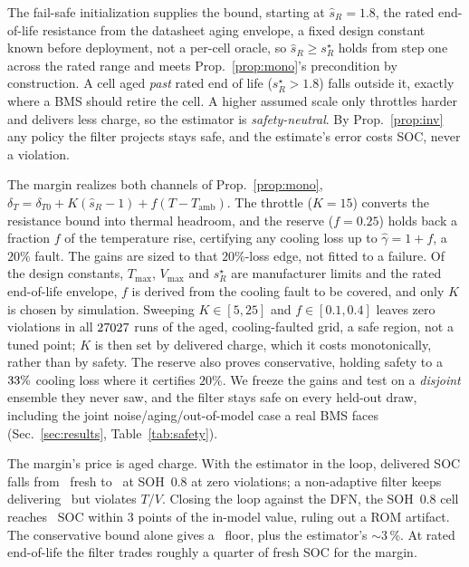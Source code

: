 \documentclass[conference]{IEEEtran}
\newcommand{\SI}[2]{#1\,#2}
\begin{document}
The fail-safe initialization supplies the bound, starting at $\hat s_R{=}1.8$, the rated
end-of-life resistance from the datasheet aging envelope, a fixed design constant known before
deployment, not a per-cell oracle, so $\hat s_R\ge s_R^\star$ holds from step one across the
rated range and meets Prop.~\ref{prop:mono}'s precondition by construction. A cell aged \emph{past}
rated end of life ($s_R^\star>1.8$) falls outside it, exactly where a BMS should retire the cell. A
higher assumed scale only throttles harder and delivers less charge, so the estimator is
\emph{safety-neutral}. By Prop.~\ref{prop:inv} any policy the filter projects stays safe, and the
estimate's error costs SOC, never a violation.

The margin realizes both channels of Prop.~\ref{prop:mono},
$\delta_T{=}\delta_{T0}{+}K(\hat s_R{-}1){+}f(T{-}T_\mathrm{amb})$. The throttle ($K{=}15$) converts
the resistance bound into thermal headroom, and the reserve ($f{=}0.25$) holds back a fraction $f$ of
the temperature rise, certifying any cooling loss up to $\hat\gamma{=}1{+}f$, a $20\%$ fault. The
gains are sized to that $20\%$-loss edge, not fitted to a failure. Of the design constants,
$T_{\max}$, $V_{\max}$ and $s_R^\star$ are manufacturer limits and the rated end-of-life envelope,
$f$ is derived from the cooling fault to be covered, and only $K$ is chosen by simulation. Sweeping
$K\in[5,25]$ and $f\in[0.1,0.4]$ leaves zero violations in all $27027$ runs of the aged,
cooling-faulted grid, a safe region, not a tuned point; $K$ is then set by delivered charge, which it
costs monotonically, rather than by safety. The reserve also proves conservative, holding safety to a $33\%$
cooling loss where it certifies $20\%$. We freeze the gains and test on a \emph{disjoint} ensemble they never saw, and the filter stays safe on
every held-out draw, including the joint noise/aging/out-of-model case a real BMS faces
(Sec.~\ref{sec:results}, Table~\ref{tab:safety}).

The margin's price is aged charge. With the estimator in the loop, delivered SOC falls from
\estSocFresh\ fresh to \estSocAged\ at SOH~0.8 at zero violations; a non-adaptive filter keeps
delivering \estNomSocAged\ but violates $T$/$V$. Closing the loop against the DFN, the SOH~0.8 cell
reaches \clSocAged\ SOC within $3$ points of the in-model value, ruling out a ROM artifact. The conservative bound alone gives a \clOracleSocAged\ floor, plus the estimator's $\sim$\SI{3}{\%}. At
rated end-of-life the filter trades roughly a quarter of fresh SOC for the margin.
\end{document}
